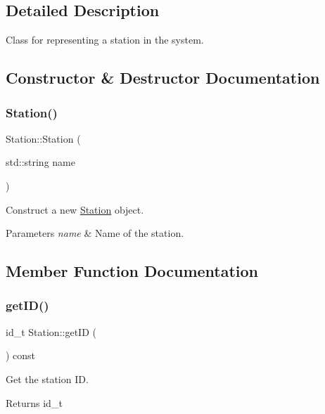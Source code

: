 \subsection{Detailed Description}
Class for representing a station in the system. 

\subsection{Constructor \& Destructor Documentation}
\mbox{\label{classStation_a53a471eb11c9431c3e89058d558f7601}} 
\subsubsection{\texorpdfstring{Station()}{Station()}}
{\footnotesize\ttfamily Station\+::\+Station (\begin{DoxyParamCaption}\item[{std\+::string}]{name }\end{DoxyParamCaption})}



Construct a new \mbox{\hyperlink{classStation}{Station}} object. 


\begin{DoxyParams}{Parameters}
{\em name} & Name of the station. \\
\hline
\end{DoxyParams}


\subsection{Member Function Documentation}
\mbox{\label{classStation_acbc5832d77cbe29c9006212b9cc32a42}} 
\subsubsection{\texorpdfstring{get\+I\+D()}{getID()}}
{\footnotesize\ttfamily id\+\_\+t Station\+::get\+ID (\begin{DoxyParamCaption}{ }\end{DoxyParamCaption}) const}



Get the station ID. 

\begin{DoxyReturn}{Returns}
id\+\_\+t 
\end{DoxyReturn}
\mbox{\label{classStation_ac823ae175ec0e2baff462ed9612c7bae}} 
